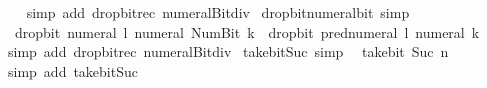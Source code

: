 \begin{isabellebody}
%
\isadelimproof
\ \ %
\endisadelimproof
%
\isatagproof
{}\isamarkupfalse%
\ {\isacharparenleft}{\kern0pt}simp\ add{\isacharcolon}{\kern0pt}\ drop{\isacharunderscore}{\kern0pt}bit{\isacharunderscore}{\kern0pt}rec\ numeral{\isacharunderscore}{\kern0pt}Bit{}{\isacharunderscore}{\kern0pt}div{\isacharunderscore}{\kern0pt}{}{\isacharparenright}{\kern0pt}%
\endisatagproof
{\isafoldproof}%
%
\isadelimproof
\isanewline
%
\endisadelimproof
\isanewline
{}\isamarkupfalse%
\ drop{\isacharunderscore}{\kern0pt}bit{\isacharunderscore}{\kern0pt}numeral{\isacharunderscore}{\kern0pt}bit{}\ {\isacharbrackleft}{\kern0pt}simp{\isacharbrackright}{\kern0pt}{\isacharcolon}{\kern0pt}\isanewline
\ \ {\isacartoucheopen}drop{\isacharunderscore}{\kern0pt}bit\ {\isacharparenleft}{\kern0pt}numeral\ l{\isacharparenright}{\kern0pt}\ {\isacharparenleft}{\kern0pt}numeral\ {\isacharparenleft}{\kern0pt}Num{\isachardot}{\kern0pt}Bit{}\ k{\isacharparenright}{\kern0pt}{\isacharparenright}{\kern0pt}\ {\isacharequal}{\kern0pt}\ drop{\isacharunderscore}{\kern0pt}bit\ {\isacharparenleft}{\kern0pt}pred{\isacharunderscore}{\kern0pt}numeral\ l{\isacharparenright}{\kern0pt}\ {\isacharparenleft}{\kern0pt}numeral\ k{\isacharparenright}{\kern0pt}{\isacartoucheclose}\isanewline
%
\isadelimproof
\ \ %
\endisadelimproof
%
\isatagproof
{}\isamarkupfalse%
\ {\isacharparenleft}{\kern0pt}simp\ add{\isacharcolon}{\kern0pt}\ drop{\isacharunderscore}{\kern0pt}bit{\isacharunderscore}{\kern0pt}rec\ numeral{\isacharunderscore}{\kern0pt}Bit{}{\isacharunderscore}{\kern0pt}div{\isacharunderscore}{\kern0pt}{}{\isacharparenright}{\kern0pt}%
\endisatagproof
{\isafoldproof}%
%
\isadelimproof
\isanewline
%
\endisadelimproof
\isanewline
{}\isamarkupfalse%
\ take{\isacharunderscore}{\kern0pt}bit{\isacharunderscore}{\kern0pt}Suc{\isacharunderscore}{\kern0pt}{}\ {\isacharbrackleft}{\kern0pt}simp{\isacharbrackright}{\kern0pt}{\isacharcolon}{\kern0pt}\isanewline
\ \ {\isacartoucheopen}take{\isacharunderscore}{\kern0pt}bit\ {\isacharparenleft}{\kern0pt}Suc\ n{\isacharparenright}{\kern0pt}\ {}\ {\isacharequal}{\kern0pt}\ {}{\isacartoucheclose}\isanewline
%
\isadelimproof
\ \ %
\endisadelimproof
%
\isatagproof
{}\isamarkupfalse%
\ {\isacharparenleft}{\kern0pt}simp\ add{\isacharcolon}{\kern0pt}\ take{\isacharunderscore}{\kern0pt}bit{\isacharunderscore}{\kern0pt}Suc{\isacharparenright}{\kern0pt}%
\endisatagproof
{\isafoldproof}%
%
\isadelimproof
\isanewline
%

\end{isabellebody}
